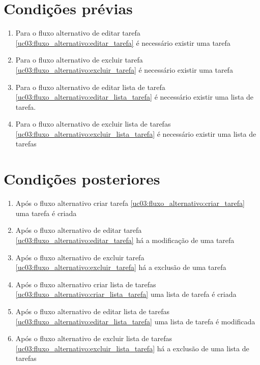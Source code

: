 \documentclass[
	12pt,				%
	oneside,			%
	a4paper,			%
	english,			%
	brazil,				%
	]{abntex2}
\begin{document}


\section{Condições prévias}
\begin{enumerate}
    \item Para o fluxo alternativo de editar tarefa \ref{uc03:fluxo_alternativo:editar_tarefa} é necessário existir uma tarefa
    \item Para o fluxo alternativo de excluir tarefa \ref{uc03:fluxo_alternativo:excluir_tarefa} é necessário existir uma tarefa
    \item Para o fluxo alternativo de editar lista de tarefa \ref{uc03:fluxo_alternativo:editar_lista_tarefa} é necessário existir uma lista de tarefa.
    \item Para o fluxo alternativo de excluir lista de tarefas \ref{uc03:fluxo_alternativo:excluir_lista_tarefa} é necessário existir uma lista de tarefas
\end{enumerate}

\section{Condições posteriores}
\begin{enumerate}
    \item Após o fluxo alternativo criar tarefa \ref{uc03:fluxo_alternativo:criar_tarefa} uma tarefa é criada
    \item Após o fluxo alternativo de editar tarefa \ref{uc03:fluxo_alternativo:editar_tarefa} há a modificação de uma tarefa 
    \item Após o fluxo alternativo de excluir tarefa \ref{uc03:fluxo_alternativo:excluir_tarefa} há a exclusão de uma tarefa
    \item Após o fluxo alternativo criar lista de tarefas \ref{uc03:fluxo_alternativo:criar_lista_tarefa} uma lista de tarefa é criada
    \item Após o fluxo alternativo de editar lista de tarefas \ref{uc03:fluxo_alternativo:editar_lista_tarefa} uma lista de tarefa é modificada
    \item Após o fluxo alternativo de excluir lista de tarefas \ref{uc03:fluxo_alternativo:excluir_lista_tarefa} há a exclusão de uma lista de tarefas
    
\end{enumerate}
\end{document}
